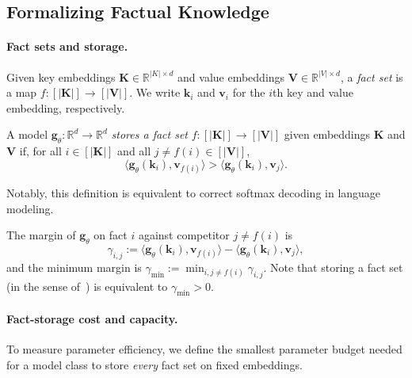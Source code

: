 \subsection{Formalizing Factual Knowledge}
\label{subsec:definitions_maintext}

\paragraph{Fact sets and storage.}
Given key embeddings $\mathbf{K}\in \mathbb{R}^{|K| \times d}$ and value embeddings $\mathbf{V}\in\mathbb{R}^{|V| \times d}$, a \textit{fact set} is a map $f: [|\mathbf{K}|]\to [|\mathbf{V}|]$. We write $\mathbf{k}_{i}$ and $\mathbf{v}_{i}$ for the $i$th key and value embedding, respectively.

\begin{definition}
\label{def:fact-storage}
A model $\mathbf{g}_\theta: \mathbb{R}^d\to \mathbb{R}^d$ \textit{stores a fact set} $f: [|\mathbf{K}|]\to [|\mathbf{V}|]$ given embeddings $\mathbf{K}$ and $\mathbf{V}$ if, for all $i \in [|\mathbf{K}|]$ and all $j \neq f(i) \in [|\mathbf{V}|]$,
\begin{equation}
    \label{eq:decoding-criterion-maintext}
    \langle \mathbf{g}_\theta(\mathbf{k}_{i}), \mathbf{v}_{f(i)} \rangle > \langle \mathbf{g}_\theta(\mathbf{k}_{i}), \mathbf{v}_{j} \rangle.
\end{equation}
\end{definition}

Notably, this definition is equivalent to correct softmax decoding in language modeling.

\begin{definition}[Margin]
\label{def:margin}
The margin of $\mathbf{g}_\theta$ on fact $i$ against competitor $j \neq f(i)$ is
\begin{equation}
    \label{eq:margin-maintext}
    \gamma_{i,j} := \langle \mathbf{g}_\theta(\mathbf{k}_{i}), \mathbf{v}_{f(i)} \rangle - \langle \mathbf{g}_\theta(\mathbf{k}_{i}), \mathbf{v}_{j} \rangle,
\end{equation}
and the minimum margin is $\gamma_{\min} := \min_{i, j \neq f(i)} \gamma_{i,j}$.
Note that storing a fact set (in the sense of~) is equivalent to $\gamma_{\min} > 0$.
\end{definition}


\paragraph{Fact-storage cost and capacity.}
To measure parameter efficiency, we define the smallest parameter budget needed for a model class to store \emph{every} fact set on fixed embeddings.

